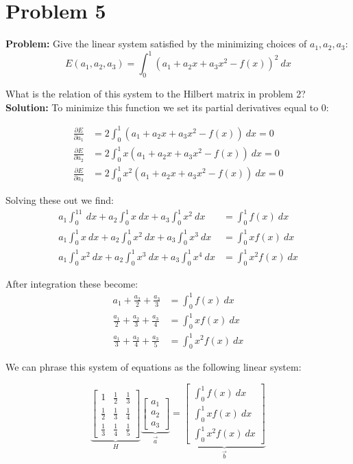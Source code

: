 \documentclass{article}
\begin{document}
\section*{Problem 5}
\textbf{Problem:} Give the linear system satisfied by the minimizing choices of $a_1,a_2,a_3$:
$$E(a_1,a_2,a_3)=\int_0^1(a_1+a_2x+a_3x^2-f(x))^2\ dx$$

What is the relation of this system to the Hilbert matrix in problem 2?
\newpage
\textbf{Solution:} To minimize this function we set its partial derivatives equal to 0:

$$\begin{align*}
\frac{\partial E}{\partial a_1}&=2\int_0^1(a_1+a_2x+a_3x^2-f(x))\ dx=0\\
\frac{\partial E}{\partial a_2}&=2\int_0^1x(a_1+a_2x+a_3x^2-f(x))\ dx=0\\
\frac{\partial E}{\partial a_3}&=2\int_0^1x^2(a_1+a_2x+a_3x^2-f(x))\ dx=0
\end{align*}$$

Solving these out we find:
$$\begin{align*}
a_1\int_0^11\ dx+a_2\int_0^1x\ dx+a_3\int_0^1x^2\ dx&=\int_0^1f(x)\ dx\\
a_1\int_0^1x\ dx+a_2\int_0^1x^2\ dx+a_3\int_0^1x^3\ dx&=\int_0^1xf(x)\ dx\\
a_1\int_0^1x^2\ dx+a_2\int_0^1x^3\ dx+a_3\int_0^1x^4\ dx&=\int_0^1x^2f(x)\ dx
\end{align*}$$

After integration these become:
$$\begin{align*}
a_1+\frac{a_2}{2}+\frac{a_3}{3}&=\int_0^1f(x)\ dx\\
\frac{a_1}{2}+\frac{a_2}{3}+\frac{a_3}{4}&=\int_0^1xf(x)\ dx\\
\frac{a_1}{3}+\frac{a_2}{4}+\frac{a_3}{5}&=\int_0^1x^2f(x)\ dx
\end{align*}$$

We can phrase this system of equations as the following linear system:

$$\underbrace{\begin{bmatrix}
1&\frac{1}{2}&\frac{1}{3}\\
\frac{1}{2}&\frac{1}{3}&\frac{1}{4}\\
\frac{1}{3}&\frac{1}{4}&\frac{1}{5}
\end{bmatrix}}_{H}
\underbrace{\begin{bmatrix}
a_1\\a_2\\a_3
\end{bmatrix}}_{\vec a}=
\underbrace{\begin{bmatrix}
\int_0^1f(x)\ dx\\\int_0^1xf(x)\ dx\\\int_0^1x^2f(x)\ dx
\end{bmatrix}}_{\vec b}$$
\end{document}

